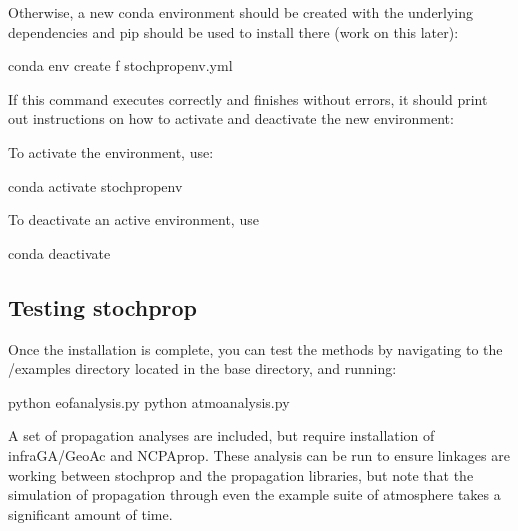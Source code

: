 \documentclass[letterpaper,10pt,english]{sphinxmanual}
\begin{document}
\sphinxAtStartPar
Otherwise, a new conda environment should be created with the underlying dependencies and pip should be used to install there (work on this later):

\begin{sphinxVerbatim}[commandchars=\\\{\}]
\PYGZgt{}\PYGZgt{} conda env create \PYGZhy{}f stochprop\PYGZus{}env.yml
\end{sphinxVerbatim}

\sphinxAtStartPar
If this command executes correctly and finishes without errors, it should print out instructions on how to activate and deactivate the new environment:

\sphinxAtStartPar
To activate the environment, use:

\begin{sphinxVerbatim}[commandchars=\\\{\}]
\PYGZgt{}\PYGZgt{} conda activate stochprop\PYGZus{}env
\end{sphinxVerbatim}

\sphinxAtStartPar
To deactivate an active environment, use

\begin{sphinxVerbatim}[commandchars=\\\{\}]
\PYGZgt{}\PYGZgt{} conda deactivate
\end{sphinxVerbatim}


\subsection{Testing stochprop}
\label{\detokenize{installation:testing-stochprop}}
\sphinxAtStartPar
Once the installation is complete, you can test the methods by navigating to the /examples directory located in the base directory, and running:

\begin{sphinxVerbatim}[commandchars=\\\{\}]
\PYGZgt{}\PYGZgt{} python eof\PYGZus{}analysis.py
\PYGZgt{}\PYGZgt{} python atmo\PYGZus{}analysis.py
\end{sphinxVerbatim}

\sphinxAtStartPar
A set of propagation analyses are included, but require installation of infraGA/GeoAc and NCPAprop.  These analysis can be run to ensure linkages are
working between stochprop and the propagation libraries, but note that the simulation of propagation through even the example suite of atmosphere
takes a significant amount of time.
\end{document}
